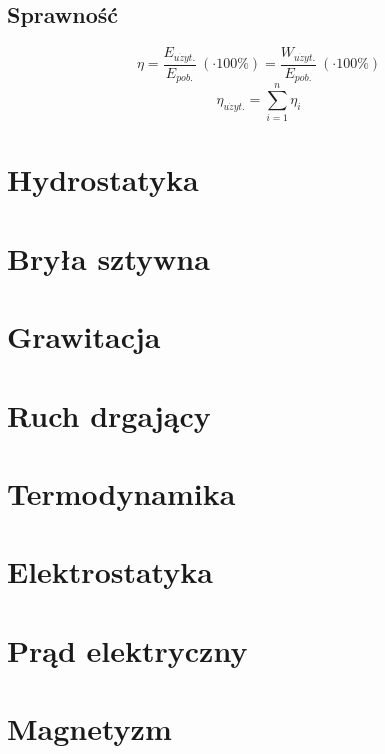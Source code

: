 \documentclass{article}
\begin{document}
    \subsection{Sprawność}
      \begin{equation*}
        \eta = \frac{E_{u\dot{z}yt.}}{E_{pob.}}\: (\cdot 100\%) = \frac{W_{u\dot{z}yt.}}{E_{pob.}}\: (\cdot 100\%)
      \end{equation*}
      \begin{equation*}
        \eta_{u\dot{z}yt.} = \sum_{i=1}^{n} \eta_i
      \end{equation*}
  \newpage
  \section{Hydrostatyka}

  \newpage
  \section{Bryła sztywna}

  \newpage
  \section{Grawitacja}

  \newpage
  \section{Ruch drgający}

  \newpage
  \section{Termodynamika}

  \newpage
  \section{Elektrostatyka}

  \newpage
  \section{Prąd elektryczny}

  \newpage
  \section{Magnetyzm}
\end{document}
